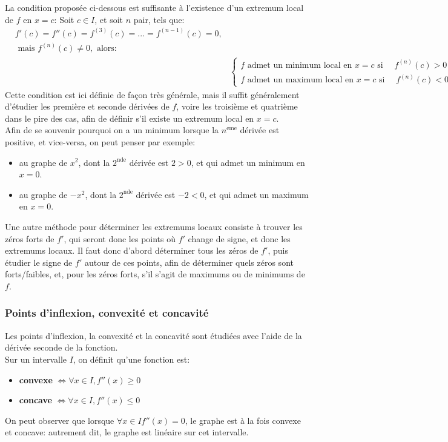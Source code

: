 \documentclass{article}
\begin{document}
La condition proposée ci-dessous est suffisante à l'existence d'un extremum local de \(f\) en \(x = c\):
Soit \(c \in I\), et soit \(n\) pair, tels que:
\begin{align*}
	&f'(c) = f''(c) = f^{(3)}(c) = ... = f^{(n-1)}(c) = 0, \\ 
	&\text{ mais } f^{(n)}(c) \neq 0, \text{ alors:} \\
	& &\begin{cases}
		f \text{ admet un minimum local en } x = c \text{ si } \quad f^{(n)}(c) > 0  \\
		f \text{ admet un maximum local en } x = c \text{ si } \quad f^{(n)}(c) < 0  
	\end{cases}
\end{align*}
Cette condition est ici définie de façon très générale, mais il suffit généralement d'étudier les première et seconde dérivées de \(f\), voire les troisième et quatrième dans le pire des cas, afin de définir s'il existe un extremum local en \(x = c\). \\
Afin de se souvenir pourquoi on a un minimum lorsque la \(n^\text{eme}\) dérivée est positive, et vice-versa, on peut penser par exemple:
\begin{itemize}
	\item au graphe de \(x^2\), dont la \(2^\text{nde}\) dérivée est \(2 > 0\), et qui admet un minimum en \(x = 0\).
	\item au graphe de \(-x^2\), dont la \(2^\text{nde}\) dérivée est  \(-2 < 0\), et qui admet un maximum en \(x = 0\).
\end{itemize}

Une autre méthode pour déterminer les extremums locaux consiste à trouver les zéros forts de \(f'\), qui seront donc les points où \(f'\) change de signe, et donc les extremums locaux. Il faut donc d'abord déterminer tous les zéros de \(f'\), puis étudier le signe de \(f'\) autour de ces points, afin de déterminer quels zéros sont forts/faibles, et, pour les zéros forts, s'il s'agit de maximums ou de minimums de \(f\).

\subsubsection{Points d'inflexion, convexité et concavité}
Les points d'inflexion, la convexité et la concavité sont étudiées avec l'aide de la dérivée seconde de la fonction. \\

Sur un intervalle \(I\), on définit qu'une fonction est:
\begin{itemize}
	\item \textbf{convexe} \( \Leftrightarrow \forall x \in I, f''(x) \geq 0\)
	\item \textbf{concave} \( \Leftrightarrow \forall x \in I, f''(x) \leq 0\)
\end{itemize}
On peut observer que lorsque \(\forall x \in I f''(x) = 0\), le graphe est à la fois convexe et concave: autrement dit, le graphe est linéaire sur cet intervalle.
\end{document}
